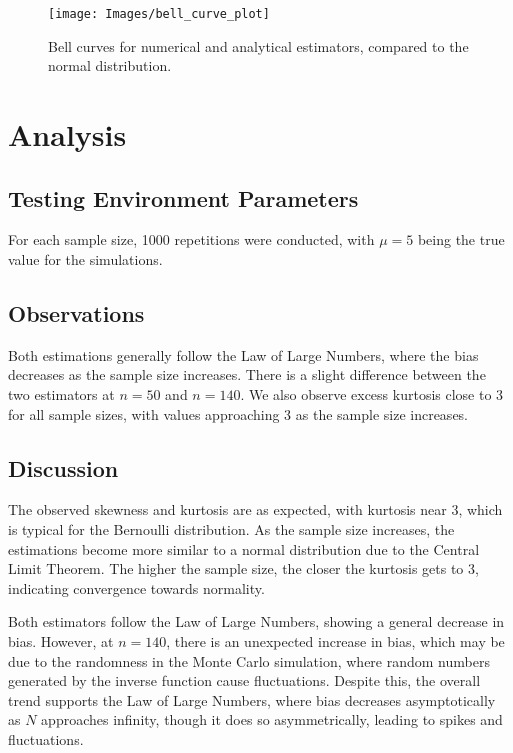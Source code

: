 \documentclass{report}
\begin{document}
\begin{figure}[H]
    \centering
    \texttt{[image: Images/bell\_curve\_plot]}
    \caption{Bell curves for numerical and analytical estimators, compared to the normal distribution.}
    \label{fig:Estimation-curves}
\end{figure}



\section{Analysis}\label{sec:analysis}

\subsection{Testing Environment Parameters}\label{subsec:testing-environment-parameters}
For each sample size, 1000 repetitions were conducted, with \(\mu = 5\) being the true value for the simulations.


\subsection{Observations}\label{subsec:observations}
Both estimations generally follow the Law of Large Numbers, where the bias decreases as the sample size increases.
There is a slight difference between the two estimators at \(n = 50\) and \(n = 140\).
We also observe excess kurtosis close to 3 for all sample sizes, with values approaching 3 as the sample size increases.


\subsection{Discussion}\label{subsec:discussion}
The observed skewness and kurtosis are as expected, with kurtosis near 3, which is typical for the Bernoulli distribution.
As the sample size increases, the estimations become more similar to a normal distribution due to the Central Limit Theorem.
The higher the sample size, the closer the kurtosis gets to 3, indicating convergence towards normality.

Both estimators follow the Law of Large Numbers, showing a general decrease in bias.
However, at \(n = 140\), there is an unexpected increase in bias, which may be due to the randomness in the Monte Carlo simulation, where random numbers generated by the inverse function cause fluctuations.
Despite this, the overall trend supports the Law of Large Numbers, where bias decreases asymptotically as \(N\) approaches infinity, though it does so asymmetrically, leading to spikes and fluctuations.
\end{document}
